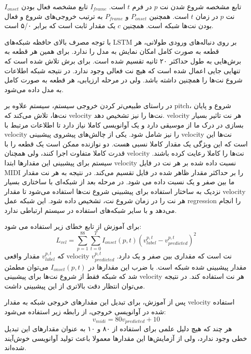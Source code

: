 $I_{onset}$ تابع مشخصه شروع شدن نت $p$ در فرم $t$ است. $I_{frame}$ تابع مشخصه
فعال بودن نت $p$ در زمان $t$ است. همچنین $P_{onset}$ و $P_{frame}$ به ترتیب
خروجی‌های شروع و فعال بودن نت‌ها شبکه است. همچنین $c$ یک مقدار ثابت است که برابر
۵/۰ است.

با توجه مصرف بالای حافظه شبکه‌های \gls{LSTM} بر روی دنباله‌های ورودی طولانی، هر
قطعه به صورت کامل امکان نمایش به مدل را ندارد. برای همین هر قطعه به برش‌هایی به
طول حداکثر ۲۰ ثانیه تقسیم شده است. برای برش تلاش شده است که تنهایی جایی اعمال
شده است که هیچ نت فعالی وجود ندارد. در نتیجه شبکه اطلاعات شروع نت‌ها را همچنین
داشته باشد. ولی در مرحله ارزیابی، هر قطعه به صورت کامل به مدل داده می‌شود.

در راستای طبیعی‌تر کردن خروجی سیستم، سیستم علاوه بر \gls{pitch}، شروع و پایان
نت‌ها، تلاش می‌کند که \gls{velocity} نت‌ها را نیز تشخیص دهد. \gls{velocity} هر
نت تاثیر بسیار بسازی در درک ما از موسیقی دارد و یک آوانویسی کاملا نیاز دارد تا
اطلاعات مرتبط با \gls{velocity} را نیز شامل شود. یکی از چالش‌های پیشروی پیشبینی
\gls{velocity} نت‌ها این است که این ویژگی یک مقدار کاملا نسبی هست. دو نوازنده
ممکن است یک قطعه را با قدرت کاملا متفاوت اجرا کنند، ولی همچنان \gls{velocity}
نت‌ها را کاملا رعایت کرده باشند. سیستم برای پیشبینی این مقدارها ابتدا
\gls{velocity} نسبت داده شده بر هر نت در فایل \gls{MIDI} را بر حداکثر مقدار ظاهر
شده در فایل تقسیم می‌کند. در نتیجه به هر نت مقدار ما بین صفر و یک نسبت داده می
شود. در مرحله بعد از شبکه‌ای با ساختاری بسیار نزدیک به ساختار استفاده برای
پیشبینی شروع نت‌ها استفاده می‌شود تا مقدار \gls{velocity} هر نت را در زمان شروع
نت، تشخیص داده شود. این شبکه عمل \gls{regression} را انجام می‌دهد و با سایر
شبکه‌های استفاده در سیستم ارتباطی ندارد.

برای آموزش از تابع خطای زیر استفاده می شود:
\begin{equation}
    L_{vel} = \sum_{p=1}^{88} \sum_{t=0}^{T} I_{onset}(p, t) (v_{label}^{p,t} - v_{predicted}^{p,t})^{2}
\end{equation}
که $v_{label}^{p, t}$ مقدار واقعی \gls{velocity} نت است که مقداری بین صفر و یک
دارد. $v_{predicted}^{p,t}$ مقدار پیشبینی شده شبکه است. با ضرب این مقدارها در
$I_{onset}(p, t)$ می‌توان مطمئن شد که شبکه فقط از شروع نت‌ها برای پیشبینی
\gls{velocity} هر نت استفاده کند. در نتیجه می‌توان انتظار دقت بالاتری از این پیشبینی داشت.

پس از آموزش، برای تبدیل این مقدارهای خروجی شبکه به مقدار \gls{velocity} استفاده
شده در آوانویسی خروجی، از رابطه زیر استفاده می‌شود:
\begin{equation}
    v_{midi} = 80 v_{predicted} + 10
\end{equation}
هر چند که هیچ دلیل علمی برای استفاده از ۸۰ و ۱۰ به عنوان مقدارهای این تبدیل خطی
وجود ندارد، ولی از آزمایش‌ها این مقدارها معمولا باعث تولید آوانویسی خوش‌آیند
شده‌اند.

